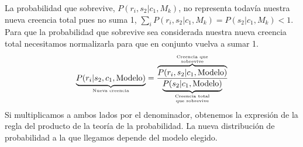 \documentclass[a4paper,11pt]{book}
\newcommand\hfrac[2]{\genfrac{}{}{0pt}{}{#1}{#2}} %
\theoremstyle{definition}
\begin{document}
La probabilidad que sobrevive, $P(r_i, s_2|c_1,M_k)$, no representa todav\'ia nuestra nueva creencia total pues no suma 1, $\sum_i P(r_i,s_2|c_1,M_k) = P(s_2|c_1,M_k) < 1$.
%
Para que la probabilidad que sobrevive sea considerada nuestra nueva creencia total necesitamos normalizarla para que en conjunto vuelva a sumar 1.
%
\begin{equation*}
\underbrace{P(r_i| s_2, c_1, \text{Modelo})}_{\hfrac{\text{Nueva creencia}}{\text{}}} = \frac{\overbrace{P(r_i, s_2|c_1, \text{Modelo})}^{\hfrac{\text{Creencia que}}{\text{sobrevive}}}}{\underbrace{P(s_2| c_1, \text{Modelo})}_{\hfrac{\text{Creencia total}}{\text{que sobrevive}}}}
\end{equation*}
%
Si multiplicamos a ambos lados por el denominador, obtenemos la expresi\'on de la regla del producto de la teor\'ia de la probabilidad.
%
La nueva distribuci\'on de probabilidad a la que llegamos depende del modelo elegido.
%
\end{document}
